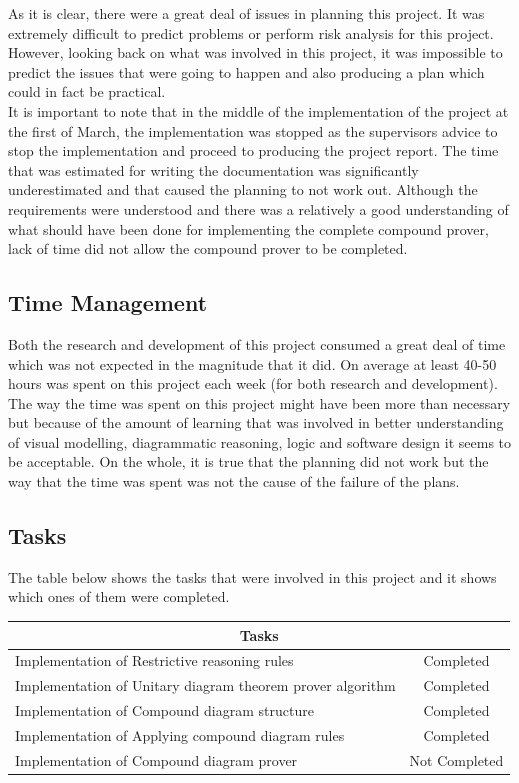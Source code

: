 \documentclass[10pt, a4paper, titlepage]{article}
\begin{document}
As it is clear, there were a great deal of issues in planning this project. It was extremely difficult to predict problems or perform risk analysis for this project. However, looking back on what was involved in this project, it was impossible to predict the issues that were going to happen and also producing a plan which could in fact be practical.\\


It is important to note that in the middle of the implementation of the project at the first of March, the implementation was stopped as the supervisors advice to stop the implementation and proceed to producing the project report. The time that was estimated for writing the documentation was significantly underestimated and that caused the planning to not work out. Although the requirements were understood and there was a relatively a good understanding of what should have been done for implementing the complete compound prover, lack of time did not allow the compound prover to be completed.
  
\subsection{Time Management}

Both the research and development of this project consumed a great deal of time which was not expected in the magnitude that it did. On average at least 40-50 hours was spent on this project each week (for both research and development). The way the time was spent on this project might have been more than necessary but because of the amount of learning that was involved in better understanding of visual modelling, diagrammatic reasoning, logic and software design it seems to be acceptable. On the whole, it is true that the planning did not work but the way that the time was spent was not the cause of the failure of the plans.
    
\subsection{Tasks}

The table below shows the tasks that were involved in this project and it shows which ones of them were completed.\\


\begin{tabular}{| l | c | }
\hline
\multicolumn{2}{|c|}{Tasks} \\
\hline	
  Implementation of Restrictive reasoning rules & Completed\\ \hline	
  Implementation of Unitary diagram theorem prover algorithm & Completed\\ \hline	
  Implementation of Compound diagram structure & Completed\\ \hline	
  Implementation of Applying compound diagram rules & Completed\\ \hline
  Implementation of Compound diagram prover & Not Completed\\ \hline	
\end{tabular}
\end{document}
